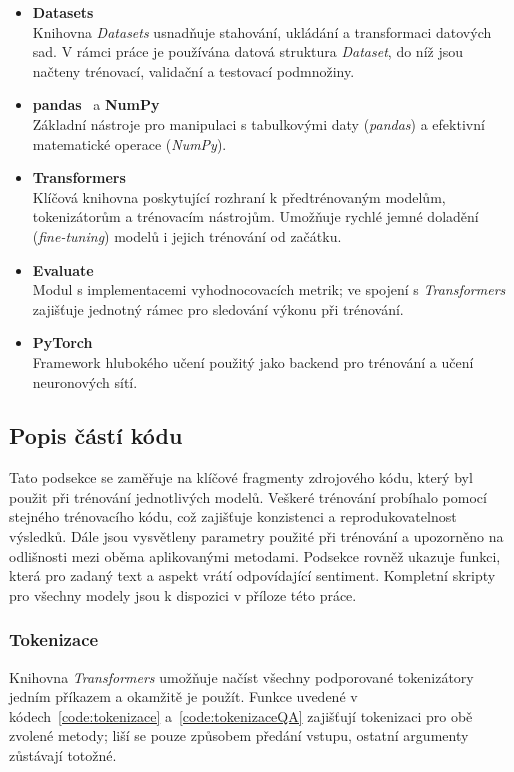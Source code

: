 \begin{itemize}
    \item \textbf{Datasets}~\cite{HuggDatasets}\\
    Knihovna \emph{Datasets} usnadňuje stahování, ukládání a transformaci datových sad. V rámci práce je používána datová struktura \emph{Dataset}, do níž jsou načteny trénovací, validační a testovací podmnožiny.

    \item \textbf{pandas}~\cite{pandas} a \textbf{NumPy}~\cite{numpy}\\
    Základní nástroje pro manipulaci s tabulkovými daty (\emph{pandas}) a efektivní matematické operace (\emph{NumPy}).

    \item \textbf{Transformers}~\cite{HuggTransformers}\\
    Klíčová knihovna poskytující rozhraní k předtrénovaným modelům, tokenizátorům a trénovacím nástrojům. Umožňuje rychlé jemné doladění (\emph{fine-tuning}) modelů i jejich trénování od začátku.

    \item \textbf{Evaluate}~\cite{HuggEvaluate}\\
    Modul s implementacemi vyhodnocovacích metrik; ve spojení s \emph{Transformers} zajišťuje jednotný rámec pro sledování výkonu při trénování.

    \item \textbf{PyTorch}~\cite{PyTorch}\\
    Framework hlubokého učení použitý jako backend pro trénování a učení neuronových sítí.
\end{itemize}

\subsection{Popis částí kódu}
Tato podsekce se zaměřuje na klíčové fragmenty zdrojového kódu, který byl použit při trénování jednotlivých modelů. Veškeré trénování probíhalo pomocí stejného trénovacího kódu, což zajišťuje konzistenci a reprodukovatelnost výsledků. Dále jsou vysvětleny parametry použité při trénování a upozorněno na odlišnosti mezi oběma aplikovanými metodami. Podsekce rovněž ukazuje funkci, která pro zadaný text a aspekt vrátí odpovídající sentiment. Kompletní skripty pro všechny modely jsou k dispozici v příloze této práce.

\subsubsection{Tokenizace}\label{PristupToken}
Knihovna \emph{Transformers} umožňuje načíst všechny podporované tokenizátory jedním příkazem a okamžitě je použít. Funkce uvedené v kódech~\ref{code:tokenizace} a~\ref{code:tokenizaceQA} zajišťují tokenizaci pro obě zvolené metody; liší se pouze způsobem předání vstupu, ostatní argumenty zůstávají totožné.

